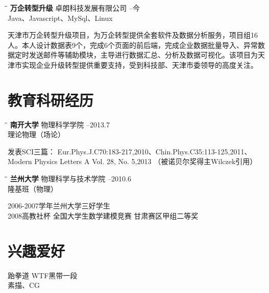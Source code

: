 \documentclass{res}
\begin{document}
\begin{CJK}{UTF8}{gbsn}
\begin{resume}
   \vspace{-0.1in}	
   \begin{tabbing}
   \hspace{2.3in}\= \hspace{2.6in}\= \kill %
    {\bf 万企转型升级} \>卓朗科技发展有限公司     --今\\
                             \>Java、Javascript、MySql、Linux
   \end{tabbing}\vspace{-20pt}      %
   天津市万企转型升级项目，为万企转型提供全套软件及数据分析服务，项目组16人。本人设计数据表9个，完成6个页面的前后端，完成企业数据批量导入、异常数据定时发送邮件等辅助模块，主导进行数据汇总、分析及数据可视化。该项目为天津市实现企业升级转型提供重要支持，受到科技部、天津市委领导的高度关注。
\section{教育科研经历}
   \vspace{-0.1in}	
   \begin{tabbing}
   \hspace{2.3in}\= \hspace{2.6in}\= \kill %
    {\bf 南开大学} \>物理科学学院     --2013.7\\
                             \>理论物理（场论）
   \end{tabbing}\vspace{-20pt}      %
    发表SCI三篇：
    Eur.Phys.J.C70:183-217,2010、Chin.Phys.C35:113-125,2011、Modern Physics Letters A Vol. 28, No. 5,2013
    （被诺贝尔奖得主Wilczek引用）
    \vspace{-0.1in}
   \begin{tabbing}
   \hspace{2.3in}\= \hspace{2.6in}\= \kill %
    {\bf 兰州大学} \>物理科学与技术学院 --2010.6\\
                          \>隆基班（物理）
   \end{tabbing}\vspace{-20pt}
    2006-2007学年兰州大学三好学生\\
    2008高教社杯 全国大学生数学建模竞赛 甘肃赛区甲组二等奖
      
\section{兴趣爱好}          
    跆拳道 WTF黑带一段\\
    素描、CG
 
\end{resume}
\end{CJK}
\end{document}
